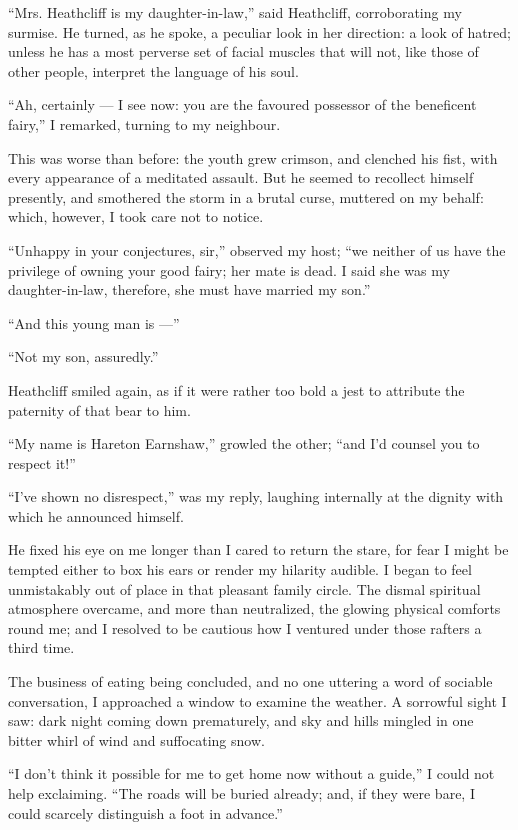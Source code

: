 \par “Mrs. Heathcliff is my daughter-in-law,” said Heathcliff, corroborating my surmise. He turned, as he spoke, a peculiar look in her direction: a look of hatred; unless he has a most perverse set of facial muscles that will not, like those of other people, interpret the language of his soul.
\par “Ah, certainly — I see now: you are the favoured possessor of the beneficent fairy,” I remarked, turning to my neighbour.
\par This was worse than before: the youth grew crimson, and clenched his fist, with every appearance of a meditated assault. But he seemed to recollect himself presently, and smothered the storm in a brutal curse, muttered on my behalf: which, however, I took care not to notice.
\par “Unhappy in your conjectures, sir,” observed my host; “we neither of us have the privilege of owning your good fairy; her mate is dead. I said she was my daughter-in-law, therefore, she must have married my son.”
\par “And this young man is —”
\par “Not my son, assuredly.”
\par Heathcliff smiled again, as if it were rather too bold a jest to attribute the paternity of that bear to him.
\par “My name is Hareton Earnshaw,” growled the other; “and I'd counsel you to respect it!”
\par “I've shown no disrespect,” was my reply, laughing internally at the dignity with which he announced himself.
\par He fixed his eye on me longer than I cared to return the stare, for fear I might be tempted either to box his ears or render my hilarity audible. I began to feel unmistakably out of place in that pleasant family circle. The dismal spiritual atmosphere overcame, and more than neutralized, the glowing physical comforts round me; and I resolved to be cautious how I ventured under those rafters a third time.
\par The business of eating being concluded, and no one uttering a word of sociable conversation, I approached a window to examine the weather. A sorrowful sight I saw: dark night coming down prematurely, and sky and hills mingled in one bitter whirl of wind and suffocating snow.
\par “I don't think it possible for me to get home now without a guide,” I could not help exclaiming. “The roads will be buried already; and, if they were bare, I could scarcely distinguish a foot in advance.”
